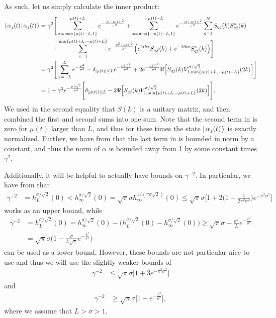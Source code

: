 \documentclass[../thesis-main/thesis-main]{subfiles}
\begin{document}
As such, let us simply calculate the inner product:
\begin{align}
  \langle\mspace{2mu} \alpha_j(t) \mspace{2mu} | \mspace{2mu} \alpha_j(t)\mspace{2mu} \rangle 
  &= \gamma^2 \Bigg[\sum_{x=\max\{\mu(t)-L,1\}}^{\mu(t) + L} e^{-\frac{(x-\mu(t))^2}{\sigma^2}} + \sum_{x=\max\{-\mu(t) - L,1\}}^{-\mu(t)+L} e^{-\frac{(x+\mu(t))^2}{\sigma^2}} \sum_{q=1}^N S_{qj}(k)S^*_{qj}(k)\nonumber\\
  &\qquad  + \sum_{x=1}^{\min\{\mu(t)+L,-\mu(t) + L\}} e^{-\frac{x^2 + \mu(t)^2}{\sigma^2}} \Big(e^{2ikx} S_qj(k) + e^{-2ikx} S_{qj}^*(k) \Big) \Bigg] \\
  & = \gamma^2 \Bigg[ \sum_{x=-L}^L e^{-\frac{x^2}{\sigma^2}} - \delta_{|\mu(t)| \leq L} e^{-\frac{\mu(t)^2}{\sigma^2}}  + 2 e^{-\frac{\mu(t)^2}{\sigma^2}} \Re\Big[S_{qj}(k)V_{1,\min\{\mu(t) + L,-\mu(t) + L\}}^{\sigma/\sqrt{2}}(2k)\Big] \Bigg]\\
  &= 1 - \gamma^2 e^{-\frac{\mu(t)^2}{\sigma^2}} \Bigg[ \delta_{|\mu(t)| \leq L}   - 2 \Re\Big[S_{qj}(k)V_{1,\min\{\mu(t) + L,-\mu(t) + L\}}^{\sigma/\sqrt{2}}(2k)\Big] \Bigg].\label{eq:alpha_norm}
\end{align}
We used in the second equality that $S(k)$ is a unitary matrix, and then combined the first and second sums into one sum.  Note that the second term in  is zero for $\mu(t)$ larger than $L$, and thus for these times the state $|\mspace{2mu} \alpha_j(t) \mspace{2mu} \rangle$ is exactly normalized.  Further, we have from  that the last term in  is bounded in norm by a constant, and thus the norm of $\alpha$ is bonuded away from 1 by some constant times $\gamma^2$.

Additionally, it will be helpful to actually have bounds on $\gamma^{-2}$.  In particular, we have from  that 
\begin{align}
  \gamma^{-2} &= h_{L}^{\sigma/\sqrt{2}}(0)   < h_{\infty}^{\sigma/\sqrt{2}}(0)
     = \sqrt{\pi} \sigma h_{\infty}^{1/(\pi \sigma \sqrt{2})} (0)
     \leq \sqrt{\pi} \sigma \Big[ 1 + 2 \Big( 1 + \frac{1}{2\pi^2\sigma^2}\Big) e^{ - \pi^2\sigma^2}\Big]
\end{align}
works as an upper bound, while
\begin{align}
  \gamma^{-2} &= h_{L}^{\sigma/\sqrt{2}}(0) = h_{\infty}^{\sigma/\sqrt{2}}(0) - \big( h_{L}^{\sigma/\sqrt{2}}(0) - h_\infty^{\sigma/\sqrt{2}}(0)\big) \geq \sqrt{\pi} \sigma - \frac{\sigma^2}{L} e^{-\frac{L^2}{\sigma^2}} \\
   &= \sqrt{\pi} \sigma \Big(1 - \frac{\sigma}{L\sqrt{\pi}} e^{ - \frac{L^2}{\sigma^2}}\Big) 
\end{align}
can be used as a lower bound.  However, these bounds are not particular nice to use and thus we will use the slightly weaker bounds of
\begin{align}
  \gamma^{-2} & \leq \sqrt{\pi}\sigma \big[ 1 + 3 e^{-\pi^2 \sigma^2}\big]\label{eq:gaussian_gamma_upper_bound}
\end{align}
and
\begin{align}
  \gamma^{-2} & \geq \sqrt{\pi} \sigma \big[ 1 - e^{-\frac{L^2}{\sigma^2}}\big],\label{eq:gaussian_gamma_lower_bound}
\end{align}
where we assume that $L > \sigma > 1$.
\end{document}
